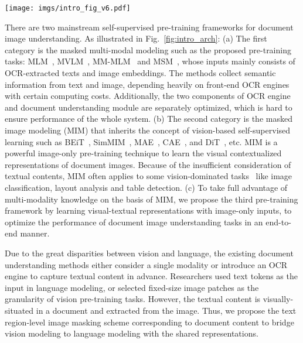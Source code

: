 \documentclass{article} \usepackage{iclr2023_conference,times}
\begin{document}
\begin{figure*}
 \centering
 \texttt{[image: imgs/intro\_fig\_v6.pdf]}
\caption{Comparisons with the main-stream pre-training models of document image understanding. (a) It shows the masked multi-modal modeling methods which input both OCR results and image embeddings. (b) The framework that inputs image-only embeddings is suitable for vision-dominated tasks like document image classification and layout analysis. (c) StrucTexTv2 learns visual-textual representations using only the information from images in the pre-training step and then optimizes various downstream tasks of document image understanding end-to-end.}
\label{fig:intro_arch}
\vspace{-1em}
\end{figure*}

There are two mainstream self-supervised pre-training frameworks for document image understanding. As illustrated in Fig.~\ref{fig:intro_arch}: (a) The first category is the masked multi-modal modeling such as the proposed pre-training tasks: MLM~\cite{devlin2018bert}, MVLM~\cite{xu2020layoutlmv2}, MM-MLM~\cite{appalaraju2021docformer} and MSM~\cite{nips2021udoc}, whose inputs mainly consists of OCR-extracted texts and image embeddings. The methods collect semantic information from text and image, depending heavily on front-end OCR engines with certain computing costs. Additionally, the two components of OCR engine and document understanding module are separately optimized, which is hard to ensure performance of the whole system. (b) The second category is the masked image modeling (MIM) that inherits the concept of vision-based self-supervised learning such as BEiT~\cite{bao2021beit}, SimMIM~\cite{Xie00LBYD022}, MAE~\cite{he2021masked}, CAE~\cite{chen2022context}, and DiT~\cite{li2022dit}, etc. MIM is a powerful image-only pre-training technique to learn the visual contextualized representations of document images. Because of the insufficient consideration of textual contents, MIM often applies to some vision-dominated tasks~\cite{li2022dit} like image classification, layout analysis and table detection. (c) To take full advantage of multi-modality knowledge on the basis of MIM, we propose the third pre-training framework by learning visual-textual representations with image-only inputs, to optimize the performance of document image understanding tasks in an end-to-end manner.


 Due to the great disparities between vision and language, the existing document understanding methods either consider a single modality or introduce an OCR engine to capture textual content in advance. Researchers used text tokens as the input in language modeling, or selected fixed-size image patches as the granularity of vision pre-training tasks. However, the textual content is visually-situated in a document and extracted from the image. Thus, we propose the text region-level image masking scheme corresponding to document content to bridge vision modeling to language modeling with the shared representations.
\end{document}
